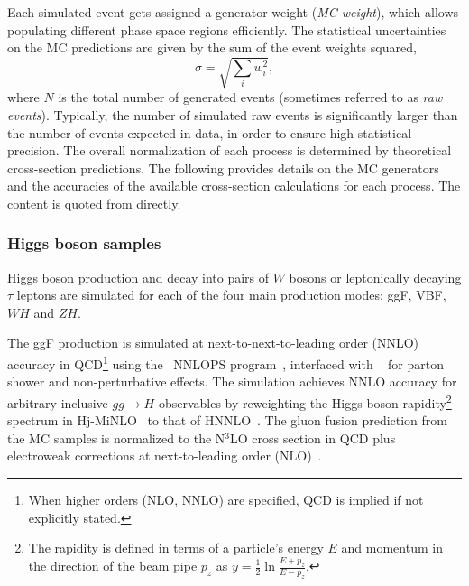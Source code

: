 Each simulated event gets assigned a generator weight (\emph{MC weight}), which allows populating different phase space regions efficiently.
The statistical uncertainties on the MC predictions are given by the sum of the event weights squared,
\begin{equation}
    \sigma = \sqrt{\sum_i w_i^2},
\end{equation}
where $N$ is the total number of generated events (sometimes referred to as \emph{raw events}). Typically, the number of simulated raw events is significantly larger than the number of events expected in data, in order to ensure high statistical precision. 
The overall normalization of each process is determined by theoretical cross-section predictions.
The following provides details on the MC generators and the accuracies of the available cross-section calculations for each process. The content is quoted from \cite{PLACEHOLDER:FOR:PAPER} directly.


\subsubsection{Higgs boson samples}
Higgs boson production and decay into pairs of $W$ bosons or leptonically decaying $\tau$ leptons are simulated for each of the four main production modes: ggF, VBF, $WH$ and $ZH$.

The ggF production is simulated at next-to-next-to-leading order (NNLO) accuracy in QCD\footnote{When higher orders (NLO, NNLO) are specified, QCD is implied if not explicitly stated.} using the \POWHEG~NNLOPS program~\cite{Nason:2004rx, Frixione:2007vw, Alioli:2010xd, Hamilton:2013fea, Hamilton:2015nsa}, interfaced with ~\cite{Sjostrand:2014zea} for parton shower and non-perturbative effects.
The simulation achieves NNLO accuracy for arbitrary inclusive $gg\to H$ observables by reweighting the Higgs boson rapidity\footnote{The rapidity is defined in terms of a particle's energy $E$ and momentum in the direction of the beam pipe $p_z$ as $y = \frac{1}{2}\ln\frac{E+p_z}{E-p_z}$.} spectrum in Hj-MiNLO~\cite{Hamilton:2012np, Campbell:2012am, Hamilton:2012rf} to that of HNNLO~\cite{Catani:2007vq}.
The gluon fusion prediction from the MC samples is normalized to the N$^3$LO cross section in QCD plus electroweak corrections at next-to-leading order (NLO)~\cite{deFlorian:2016spz, Anastasiou:2016cez, Anastasiou:2015vya, Dulat:2018rbf, Harlander:2009mq, Harlander:2009bw, Harlander:2009my, Pak:2009dg, Actis:2008ug, Actis:2008ts, Bonetti:2018ukf}.

